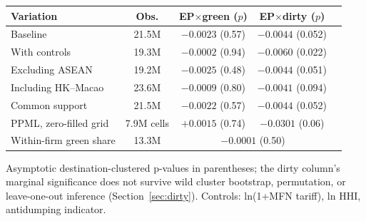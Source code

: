 \small
\begin{threeparttable}
\begin{tabular}{lcccc}
\toprule
Variation & Obs. & EP$\times$green ($p$) & EP$\times$dirty ($p$) \\
\midrule
Baseline & 21.5M & $-0.0023$ (0.57) & $-0.0044$ (0.052) \\
With controls & 19.3M & $-0.0002$ (0.94) & $-0.0060$ (0.022) \\
Excluding ASEAN & 19.2M & $-0.0025$ (0.48) & $-0.0044$ (0.051) \\
Including HK--Macao & 23.6M & $-0.0009$ (0.80) & $-0.0041$ (0.094) \\
Common support & 21.5M & $-0.0022$ (0.57) & $-0.0044$ (0.052) \\
\midrule
PPML, zero-filled grid & 7.9M cells & $+0.0015$ (0.74) & $-0.0301$ (0.06) \\
Within-firm green share & 13.3M & \multicolumn{2}{c}{$-0.0001$ (0.50)} \\
\bottomrule
\end{tabular}
\begin{tablenotes}\footnotesize
\item Asymptotic destination-clustered p-values in parentheses; the dirty column's
marginal significance does not survive wild cluster bootstrap, permutation, or
leave-one-out inference (Section~\ref{sec:dirty}). Controls: ln(1+MFN tariff), ln HHI,
antidumping indicator.
\end{tablenotes}
\end{threeparttable}
